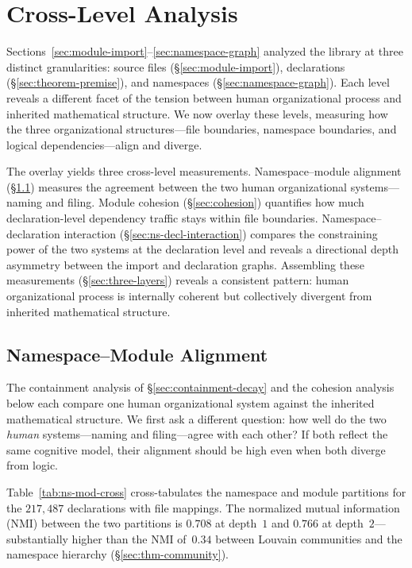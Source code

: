 \section{Cross-Level Analysis}
\label{sec:cross_level}
\label{sec:module-declaration}

Sections~\ref{sec:module-import}--\ref{sec:namespace-graph} analyzed the library at three distinct granularities: source files (\S\ref{sec:module-import}), declarations (\S\ref{sec:theorem-premise}), and namespaces (\S\ref{sec:namespace-graph}). Each level reveals a different facet of the tension between human organizational process and inherited mathematical structure. We now overlay these levels, measuring how the three organizational structures---file boundaries, namespace boundaries, and logical dependencies---align and diverge.

The overlay yields three cross-level measurements. Namespace--module alignment (\S\ref{sec:ns-mod-cross}) measures the agreement between the two human organizational systems---naming and filing. Module cohesion (\S\ref{sec:cohesion}) quantifies how much declaration-level dependency traffic stays within file boundaries. Namespace--declaration interaction (\S\ref{sec:ns-decl-interaction}) compares the constraining power of the two systems at the declaration level and reveals a directional depth asymmetry between the import and declaration graphs. Assembling these measurements (\S\ref{sec:three-layers}) reveals a consistent pattern: human organizational process is internally coherent but collectively divergent from inherited mathematical structure.

\subsection{Namespace--Module Alignment}
\label{sec:ns-mod-cross}

The containment analysis of \S\ref{sec:containment-decay} and the cohesion analysis below each compare one human organizational system against the inherited mathematical structure. We first ask a different question: how well do the two \emph{human} systems---naming and filing---agree with each other? If both reflect the same cognitive model, their alignment should be high even when both diverge from logic.

Table~\ref{tab:ns-mod-cross} cross-tabulates the namespace and module partitions for the $217{,}487$ declarations with file mappings. The normalized mutual information (NMI) between the two partitions is $0.708$ at depth~$1$ and $0.766$ at depth~$2$---substantially higher than the NMI of~$0.34$ between Louvain communities and the namespace hierarchy (\S\ref{sec:thm-community}).

